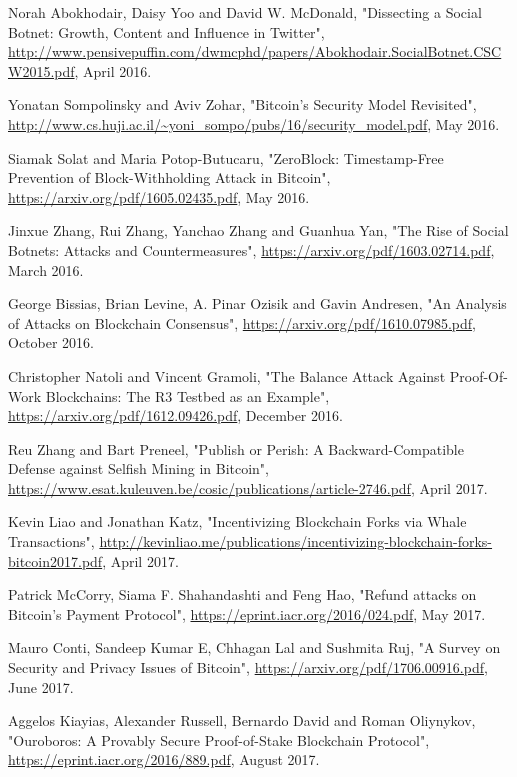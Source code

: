 \documentclass[12pt,a4paper]{article}
\begin{document}
\begin{thebibliography}{9}
Norah Abokhodair, Daisy Yoo and David W. McDonald,
"Dissecting a Social Botnet: Growth, Content and Influence in Twitter",
\url{http://www.pensivepuffin.com/dwmcphd/papers/Abokhodair.SocialBotnet.CSCW2015.pdf},
April 2016.

Yonatan Sompolinsky and Aviv Zohar,
"Bitcoin's Security Model Revisited",
\url{http://www.cs.huji.ac.il/~yoni_sompo/pubs/16/security_model.pdf},
May 2016.

Siamak Solat and Maria Potop-Butucaru,
"ZeroBlock: Timestamp-Free Prevention of Block-Withholding Attack in Bitcoin",
\url{https://arxiv.org/pdf/1605.02435.pdf},
May 2016.

Jinxue Zhang, Rui Zhang, Yanchao Zhang and Guanhua Yan,
"The Rise of Social Botnets: Attacks and Countermeasures",
\url{https://arxiv.org/pdf/1603.02714.pdf},
March 2016.

George Bissias, Brian Levine, A. Pinar Ozisik and Gavin Andresen,
"An Analysis of Attacks on Blockchain Consensus",
\url{https://arxiv.org/pdf/1610.07985.pdf},
October 2016.

Christopher Natoli and Vincent Gramoli,
"The Balance Attack Against Proof-Of-Work Blockchains: The R3 Testbed as an Example",
\url{https://arxiv.org/pdf/1612.09426.pdf},
December 2016.

Reu Zhang and Bart Preneel,
"Publish or Perish: A Backward-Compatible Defense against Selfish Mining in Bitcoin",
\url{https://www.esat.kuleuven.be/cosic/publications/article-2746.pdf},
April 2017.

Kevin Liao and Jonathan Katz,
"Incentivizing Blockchain Forks via Whale Transactions",
\url{http://kevinliao.me/publications/incentivizing-blockchain-forks-bitcoin2017.pdf},
April 2017.

Patrick McCorry, Siama F. Shahandashti and Feng Hao,
"Refund attacks on Bitcoin's Payment Protocol",
\url{https://eprint.iacr.org/2016/024.pdf},
May 2017.

Mauro Conti, Sandeep Kumar E, Chhagan Lal and Sushmita Ruj,
"A Survey on Security and Privacy Issues of Bitcoin",
\url{https://arxiv.org/pdf/1706.00916.pdf},
June 2017.

Aggelos Kiayias, Alexander Russell, Bernardo David and Roman Oliynykov,
"Ouroboros: A Provably Secure Proof-of-Stake Blockchain Protocol",
\url{https://eprint.iacr.org/2016/889.pdf},
August 2017.


\end{thebibliography}
\end{document}
